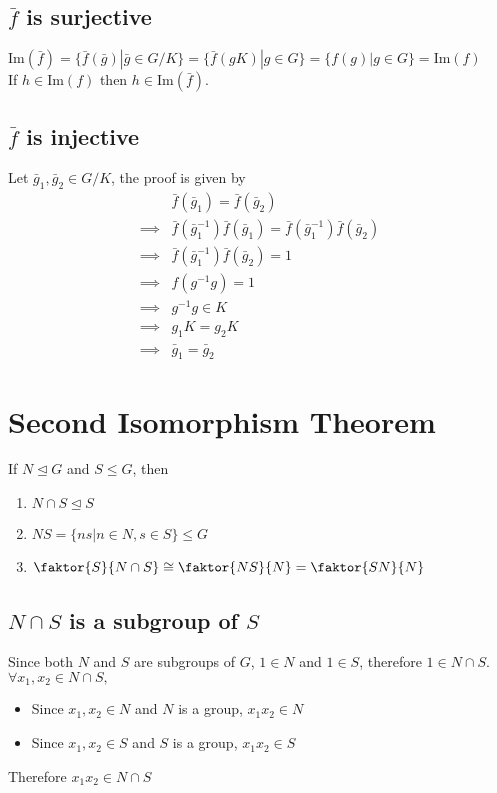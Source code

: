 \documentclass{article}
\renewcommand{\Im}{\text{Im}}
\begin{document}
	\subsection*{$\bar{f}$ is surjective}
	$\Im(\bar{f})=\{\bar{f}(\bar{g})|\bar{g}\in G/K\}=\{\bar{f}(gK)|g\in G\}=\{f(g)|g\in G\}=\Im(f)$\\
	If $h\in\Im(f)$ then $h\in\Im(\bar{f})$.
	\subsection*{$\bar{f}$ is injective}
	Let $\bar{g}_1,\bar{g}_2\in G/K$, the proof is given by \begin{align*}
		&\bar{f}(\bar{g}_1)=\bar{f}(\bar{g}_2) \\
		\implies &
		\bar{f}(\bar{g}_1^{-1})\bar{f}(\bar{g}_1)=\bar{f}(\bar{g}_1^{-1})\bar{f}(\bar{g}_2) \\
		\implies &
		\bar{f}(\bar{g}_1^{-1})\bar{f}(\bar{g}_2)=1\\
		\implies & f(g^{-1}g)=1\\
		\implies & g^{-1}g\in K\\
		\implies & g_1K=g_2K\\
		\implies & \bar{g}_1=\bar{g}_2
	\end{align*}
	
		\section*{Second Isomorphism Theorem}
	If $N\trianglelefteq G$ and $S\leq G$, then\begin{enumerate}
		\item $N\cap S\trianglelefteq S$
		\item $NS=\{ns|n\in N,s\in S\}\leq G$
		\item $\faktor{S}{N\cap S}\cong \faktor{NS}{N}=\faktor{SN}{N}$
	\end{enumerate}
	\subsection*{$N\cap S$ is a subgroup of $S$}
	Since both $N$ and $S$ are subgroups of $G$, $1\in N$ and $1\in S$, therefore $1\in N\cap S$.\medskip\\
	$\forall x_1,x_2\in N\cap S,$\begin{itemize}
		\item Since $x_1,x_2\in N$ and $N$ is a group, $x_1x_2\in N$ 
		\item Since $x_1,x_2\in S$ and $S$ is a group, $x_1x_2\in S$ 
	\end{itemize}
	Therefore $x_1x_2\in N\cap S$
\end{document}

